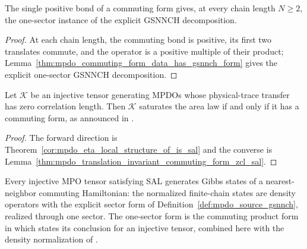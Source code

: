 \begin{lemma}
    \label{thm:mpdo_eta_local_structure_has_gsnnch_form}
    \leanok
    The single positive bond of a commuting form gives, at every chain length
    $N\ge2$, the one-sector instance of the explicit GSNNCH decomposition.
\end{lemma}

\begin{proof}\leanok
    At each chain length, the commuting bond is positive, its first two
    translates commute, and the operator is a positive multiple of their
    product; Lemma~\ref{thm:mpdo_commuting_form_data_has_gsnnch_form} gives the
    explicit one-sector GSNNCH decomposition.
\end{proof}

\begin{theorem}
    \label{thm:mpdo_sal_iff_commuting_form}
    \leanok
    Let $\mathcal K$ be an injective tensor generating MPDOs whose
    physical-trace transfer has zero correlation length. Then $\mathcal K$
    saturates the area law if and only if it has a commuting form, as
    announced in \cite[Appendix~C.2, line~1567]{Cirac2016MPDO_arXiv}.
\end{theorem}

\begin{proof}\leanok
    The forward direction is Theorem~\ref{cor:mpdo_eta_local_structure_of_is_sal}
    and the converse is
    Lemma~\ref{thm:mpdo_translation_invariant_commuting_form_zcl_sal}.
\end{proof}

\begin{lemma}
    \label{thm:mpdo_injective_sal_is_gsnnch}
    \leanok
    Every injective MPO tensor satisfying SAL generates Gibbs states of a
    nearest-neighbor commuting Hamiltonian: the normalized finite-chain
    states are density operators with the explicit sector form of
    Definition~\ref{def:mpdo_source_gsnnch}, realized through one sector.
    The one-sector form is the commuting product form in which
    \cite[Proposition~C.8]{Cirac2016MPDO_arXiv} states its conclusion for an
    injective tensor, combined here with the density normalization of
    \cite[Definition~4.8]{Cirac2016MPDO_arXiv}.
\end{lemma}

